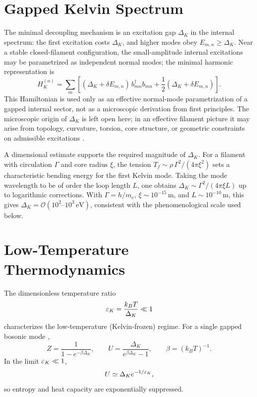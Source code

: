 \documentclass[pdflatex,sn-mathphys-num]{sn-jnl}
\begin{document}
    \section{Gapped Kelvin Spectrum}\label{sec:gap}
        The minimal decoupling mechanism is an excitation gap $\Delta_K$ in the internal spectrum: the first excitation costs $\Delta_K$, and higher modes obey $E_{m,n}\ge\Delta_K$. Near a stable closed-filament configuration, the small-amplitude internal excitations may be parametrized as independent normal modes; the minimal harmonic representation is
        \begin{equation}
            H_K^{(n)} = \sum_m \left[
                                   (\Delta_K+\delta E_{m,n})\, b_{mn}^\dagger b_{mn}
                                   + \frac{1}{2}(\Delta_K+\delta E_{m,n})
            \right].
        \end{equation}
        This Hamiltonian is used only as an effective normal-mode parametrization of a gapped internal sector, not as a microscopic derivation from first principles. The microscopic origin of $\Delta_K$ is left open here; in an effective filament picture it may arise from topology, curvature, torsion, core structure, or geometric constraints on admissible excitations \cite{Ricca1996}.

        A dimensional estimate supports the required magnitude of $\Delta_K$. For a filament with circulation $\Gamma$ and core radius $\xi$, the tension $T_f \sim \rho \, \Gamma^2/(4\pi \xi^2)$ sets a characteristic bending energy for the first Kelvin mode. Taking the mode wavelength to be of order the loop length $L$, one obtains $\Delta_K \sim \Gamma^2/(4\pi \xi L)$ up to logarithmic corrections. With $\Gamma = h/m_e$, $\xi \sim 10^{-15}\,\mathrm{m}$, and $L \sim 10^{-10}\,\mathrm{m}$, this gives $\Delta_K = \mathcal{O}(10^2\text{--}10^3\,\mathrm{eV})$, consistent with the phenomenological scale used below.

    \section{Low-Temperature Thermodynamics}\label{sec:lowT}
        The dimensionless temperature ratio
        \[
            \varepsilon_K = \frac{k_B T}{\Delta_K} \ll 1
        \]
        characterizes the low-temperature (Kelvin-frozen) regime.
        For a single gapped bosonic mode \cite{Pathria2011},
        \begin{equation}
            Z = \frac{1}{1 - e^{-\beta\Delta_K}}, \qquad
            U = \frac{\Delta_K}{e^{\beta\Delta_K} - 1}, \qquad
            \beta = (k_B T)^{-1}.
        \end{equation}
        In the limit $\varepsilon_K \ll 1$,
        \begin{equation}
            U \simeq \Delta_K e^{-1/\varepsilon_K},
        \end{equation}
        so entropy and heat capacity are exponentially suppressed.
\end{document}
